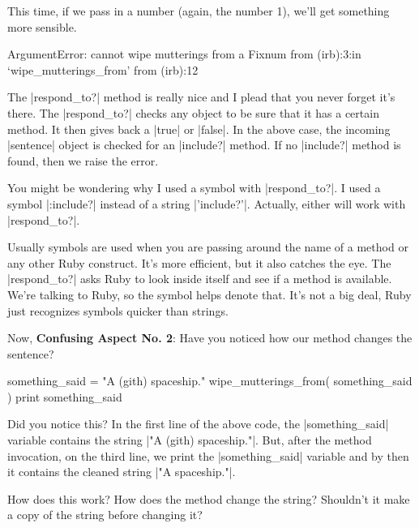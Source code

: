\documentclass[12pt,twoside]{report}
\begin{document}
This time, if we pass in a number (again, the number 1), we'll get
something more sensible.


\begin{consolecode}

 ArgumentError: cannot wipe mutterings from a Fixnum
         from (irb):3:in `wipe_mutterings_from'
         from (irb):12

\end{consolecode}


The \rubyinline|respond_to?| method is really nice and
I plead that you never forget it's there.  The
\rubyinline|respond_to?| checks any object to be sure
that it has a certain method.  It then gives back a
\rubyinline|true| or
\rubyinline|false|.  In the above case, the incoming
\rubyinline|sentence| object is checked for an
\rubyinline|include?| method.  If no
\rubyinline|include?| method is found, then we raise
the error.

You might be wondering why I used a symbol with
\rubyinline|respond_to?|.  I used a symbol
\rubyinline|:include?| instead of a string
\rubyinline|'include?'|.  Actually, either will work
with \rubyinline|respond_to?|.

Usually symbols are used when you are passing around the name of a
method or any other Ruby construct. It's more efficient, but it also
catches the eye.  The \rubyinline|respond_to?| asks
Ruby to look inside itself and see if a method is available.  We're
talking to Ruby, so the symbol helps denote that.  It's not a big
deal, Ruby just recognizes symbols quicker than strings.

Now, {\bf Confusing Aspect No. 2}: Have you noticed how our method
changes the sentence?


\begin{rubycode}

 something_said = "A (gith) spaceship."
 wipe_mutterings_from( something_said )
 print something_said

\end{rubycode}


Did you notice this?  In the first line of the above code, the
\rubyinline|something_said| variable contains the
string \rubyinline|"A (gith) spaceship."|.  But, after
the method invocation, on the third line, we print the
\rubyinline|something_said| variable and by then it
contains the cleaned string \rubyinline|"A spaceship."|.

How does this work?  How does the method change the string?  Shouldn't
it make a copy of the string before changing it?
\end{document}
